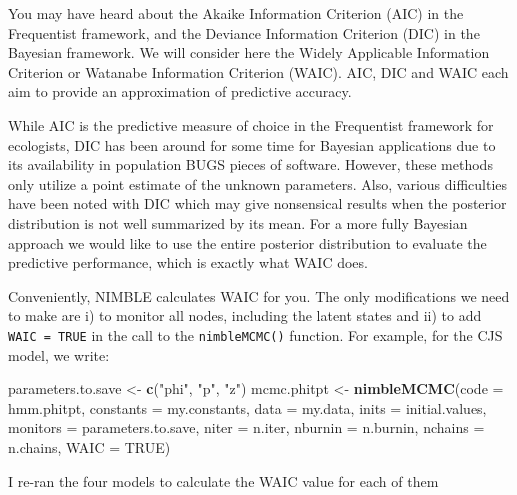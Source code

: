 \documentclass[
  12pt,
]{krantz}
\newenvironment{Shaded}{\begin{snugshade}}{\end{snugshade}}
\newcommand{\AttributeTok}[1]{\textcolor[rgb]{0.13,0.29,0.53}{#1}}
\newcommand{\ConstantTok}[1]{\textcolor[rgb]{0.56,0.35,0.01}{#1}}
\newcommand{\FunctionTok}[1]{\textcolor[rgb]{0.13,0.29,0.53}{\textbf{#1}}}
\newcommand{\NormalTok}[1]{#1}
\newcommand{\OtherTok}[1]{\textcolor[rgb]{0.56,0.35,0.01}{#1}}
\newcommand{\StringTok}[1]{\textcolor[rgb]{0.31,0.60,0.02}{#1}}
\begin{document}
You may have heard about the Akaike Information Criterion (AIC) in the Frequentist framework, and the Deviance Information Criterion (DIC) in the Bayesian framework. We will consider here the Widely Applicable Information Criterion or Watanabe Information Criterion (WAIC). AIC, DIC and WAIC each aim to provide an approximation of predictive accuracy.

While AIC is the predictive measure of choice in the Frequentist framework for ecologists, DIC has been around for some time for Bayesian applications due to its availability in population BUGS pieces of software. However, these methods only utilize a point estimate of the unknown parameters. Also, various difficulties have been noted with DIC which may give nonsensical results when the posterior distribution is not well summarized by its mean. For a more fully Bayesian approach we would like to use the entire posterior distribution to evaluate the predictive performance, which is exactly what WAIC does.

Conveniently, NIMBLE calculates WAIC for you. The only modifications we need to make are i) to monitor all nodes, including the latent states and ii) to add \texttt{WAIC\ =\ TRUE} in the call to the \texttt{nimbleMCMC()} function. For example, for the CJS model, we write:

\begin{Shaded}
\begin{Highlighting}[]
\NormalTok{parameters.to.save }\OtherTok{\textless{}{-}} \FunctionTok{c}\NormalTok{(}\StringTok{"phi"}\NormalTok{, }\StringTok{"p"}\NormalTok{, }\StringTok{"z"}\NormalTok{) }
\NormalTok{mcmc.phitpt }\OtherTok{\textless{}{-}} \FunctionTok{nimbleMCMC}\NormalTok{(}\AttributeTok{code =}\NormalTok{ hmm.phitpt,}
                          \AttributeTok{constants =}\NormalTok{ my.constants,}
                          \AttributeTok{data =}\NormalTok{ my.data,}
                          \AttributeTok{inits =}\NormalTok{ initial.values,}
                          \AttributeTok{monitors =}\NormalTok{ parameters.to.save,}
                          \AttributeTok{niter =}\NormalTok{ n.iter,}
                          \AttributeTok{nburnin =}\NormalTok{ n.burnin,}
                          \AttributeTok{nchains =}\NormalTok{ n.chains,}
                          \AttributeTok{WAIC =} \ConstantTok{TRUE}\NormalTok{) }
\end{Highlighting}
\end{Shaded}

I re-ran the four models to calculate the WAIC value for each of them
\end{document}
